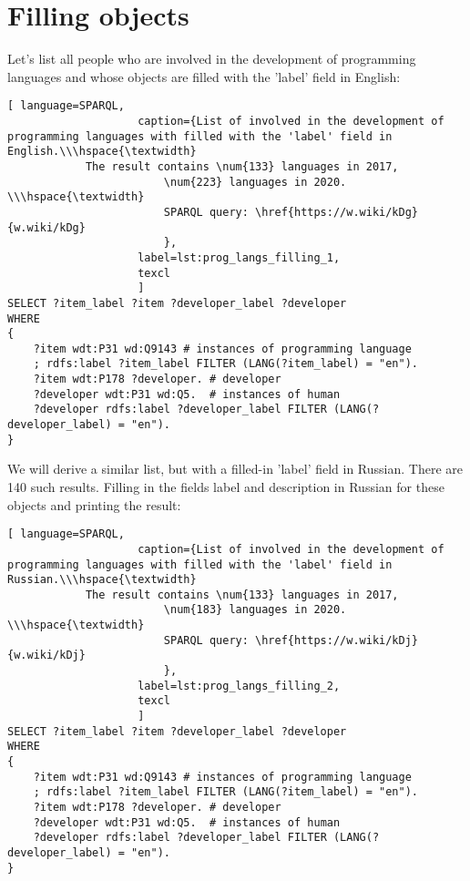 \section{Filling objects}

Let's list all people who are involved in the development of programming languages and whose objects are filled with the 'label' field in English:

\begin{lstlisting}[ language=SPARQL, 
                    caption={List of involved in the development of programming languages with filled with the 'label' field in English.\\\hspace{\textwidth}
			The result contains \num{133} languages in 2017, 
                        \num{223} languages in 2020. \\\hspace{\textwidth}
                        SPARQL query: \href{https://w.wiki/kDg}{w.wiki/kDg}
                        },
                    label=lst:prog_langs_filling_1,
                    texcl 
                    ]
SELECT ?item_label ?item ?developer_label ?developer
WHERE
{
    ?item wdt:P31 wd:Q9143 # instances of programming language
    ; rdfs:label ?item_label FILTER (LANG(?item_label) = "en"). 
    ?item wdt:P178 ?developer. # developer 
    ?developer wdt:P31 wd:Q5.  # instances of human
    ?developer rdfs:label ?developer_label FILTER (LANG(?developer_label) = "en").  
}
\end{lstlisting}%

We will derive a similar list, but with a filled-in 'label' field in Russian. There are 140 such results. Filling in the fields label and description in Russian for these objects and printing the result:

\begin{lstlisting}[ language=SPARQL, 
                    caption={List of involved in the development of programming languages with filled with the 'label' field in Russian.\\\hspace{\textwidth}
			The result contains \num{133} languages in 2017, 
                        \num{183} languages in 2020. \\\hspace{\textwidth}
                        SPARQL query: \href{https://w.wiki/kDj}{w.wiki/kDj}
                        },
                    label=lst:prog_langs_filling_2,
                    texcl 
                    ]
SELECT ?item_label ?item ?developer_label ?developer
WHERE
{
    ?item wdt:P31 wd:Q9143 # instances of programming language
    ; rdfs:label ?item_label FILTER (LANG(?item_label) = "en"). 
    ?item wdt:P178 ?developer. # developer 
    ?developer wdt:P31 wd:Q5.  # instances of human
    ?developer rdfs:label ?developer_label FILTER (LANG(?developer_label) = "en").  
}
\end{lstlisting}%


